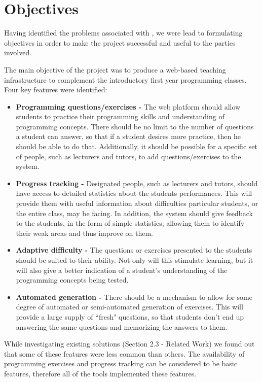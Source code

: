 \documentclass[11pt,a4paper]{report}
\begin{document}
\section{Objectives}
Having identified the problems associated with , we were lead to formulating objectives in order to make the project successful and useful to the parties involved. \newline

The main objective of the project was to produce a web-based teaching infrastructure to complement the introductory first year programming classes. Four key features were identified:

\begin{itemize}
\item \textbf{Programming questions/exercises -} The web platform should allow students to practice their programming skills and understanding of programming concepts. There should be no limit to the number of questions a student can answer, so that if a student desires more practice, then he should be able to do that. Additionally, it should be possible for a specific set of people, such as lecturers and tutors, to add questions/exercises to the system.
\item \textbf{Progress tracking -} Designated people, such as lecturers and tutors, should have access to detailed statistics about the students performances. This will provide them with useful information about difficulties particular students, or the entire class, may be facing. In addition, the system should give feedback to the students, in the form of simple statistics, allowing them to identify their weak areas and thus improve on them.
\item \textbf{Adaptive difficulty -} The questions or exercises presented to the students should be suited to their ability. Not only will this stimulate learning, but it will also give a better indication of a student's understanding of the programming concepts being tested.
\item \textbf{Automated generation -} There should be a mechanism to allow for some degree of automated or semi-automated generation of exercises. This will provide a large supply of ``fresh" questions, so that students don't end up answering the same questions and memorizing the answers to them.
\end{itemize}

While investigating existing solutions (Section 2.3 - Related Work) we found out that some of these features were less common than others. The availability of programming exercises and progress tracking can be considered to be basic features, therefore all of the tools implemented these features.
\end{document}
